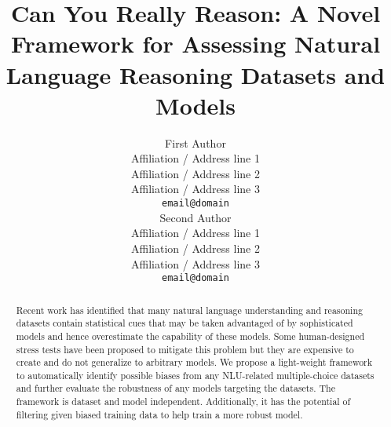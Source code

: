 \documentclass[11pt,a4paper]{article}
\title{Can You Really Reason: A Novel Framework for Assessing Natural Language Reasoning Datasets and Models}
\author{First Author \\
  Affiliation / Address line 1 \\
  Affiliation / Address line 2 \\
  Affiliation / Address line 3 \\
  \texttt{email@domain} \\\And
  Second Author \\
  Affiliation / Address line 1 \\
  Affiliation / Address line 2 \\
  Affiliation / Address line 3 \\
  \texttt{email@domain} \\}
\date{}
\begin{document}
\maketitle
\begin{abstract}
Recent work has identified
that many natural language understanding and reasoning datasets contain statistical cues that
may be taken advantaged of by sophisticated models and hence overestimate the 
capability of these models.
Some human-designed stress tests have been proposed to mitigate this problem
but they are expensive to create and do not generalize to arbitrary
models. We propose a light-weight framework to automatically identify possible biases
from any NLU-related multiple-choice datasets and further evaluate 
the robustness of any models targeting the datasets. 
The framework is dataset and model independent. Additionally, it has
the potential of filtering given biased training data to help train a more
robust model. 
\end{abstract}








\end{document}
